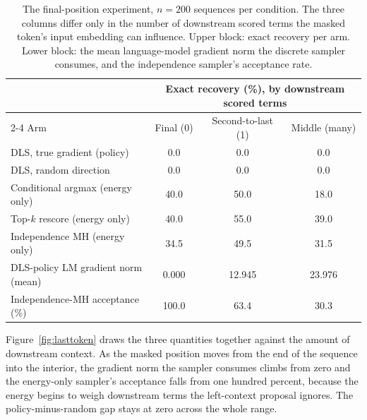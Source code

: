 \begin{table}[h]
    \centering
    \small
    \setlength{\tabcolsep}{4pt}
    \begin{tabular}{lccc}
        \toprule
        & \multicolumn{3}{c}{Exact recovery (\%), by downstream scored terms} \\
        \cmidrule(lr){2-4}
        Arm & Final (0) & Second-to-last (1) & Middle (many) \\
        \midrule
        DLS, true gradient (policy) & 0.0 & 0.0 & 0.0 \\
        DLS, random direction & 0.0 & 0.0 & 0.0 \\
        Conditional argmax (energy only) & 40.0 & 50.0 & 18.0 \\
        Top-$k$ rescore (energy only) & 40.0 & 55.0 & 39.0 \\
        Independence MH (energy only) & 34.5 & 49.5 & 31.5 \\
        \midrule
        DLS-policy LM gradient norm (mean) & 0.000 & 12.945 & 23.976 \\
        Independence-MH acceptance (\%) & 100.0 & 63.4 & 30.3 \\
        \bottomrule
    \end{tabular}
    \caption[Recovery by number of downstream scored terms, $n=200$ per condition.]{The final-position experiment, $n=200$ sequences per condition. The three columns differ only in the number of downstream scored terms the masked token's input embedding can influence. Upper block: exact recovery per arm. Lower block: the mean language-model gradient norm the discrete sampler consumes, and the independence sampler's acceptance rate.}
    \label{tab:lasttoken}
\end{table}

Figure~\ref{fig:lasttoken} draws the three quantities together against the amount of downstream context. As the masked position moves from the end of the sequence into the interior, the gradient norm the sampler consumes climbs from zero and the energy-only sampler's acceptance falls from one hundred percent, because the energy begins to weigh downstream terms the left-context proposal ignores. The policy-minus-random gap stays at zero across the whole range.

